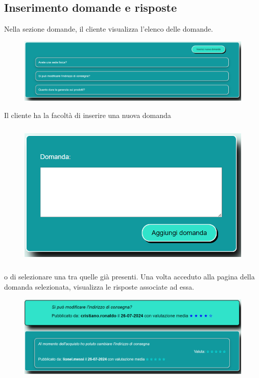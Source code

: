\documentclass[a4paper, 14pt]{article}
\begin{document}
\begin{flushleft}
			\subsection{Inserimento domande e risposte}
				Nella sezione domande, il cliente visualizza l'elenco delle domande.
				\begin{figure}[H]
					\centering
					\includegraphics[width=\textwidth, frame=2pt]{"screenDomande.png"}	
				\end{figure}
				Il cliente ha la facoltà di inserire una nuova domanda
				\begin{figure}[H]
					\centering
					\includegraphics[height=7cm, frame=2pt]{"screenInserimentoDomanda.png"}	
				\end{figure}
				o di selezionare una tra quelle già presenti. Una volta acceduto alla pagina della domanda selezionata,
				visualizza le risposte associate ad essa.
				\begin{figure}[H]
					\centering
					\includegraphics[width=\textwidth, frame=2pt]{"screenDomanda.png"}	

\end{figure}
\end{flushleft}
\end{document}
